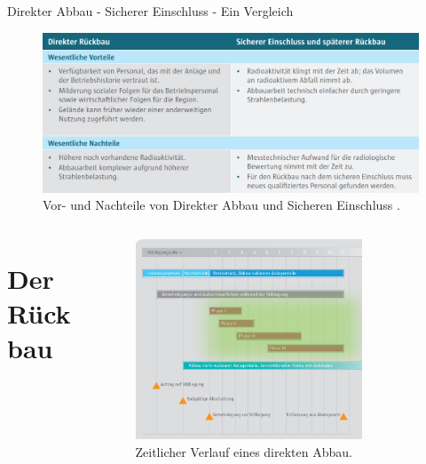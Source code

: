 \begin{frame}{ Direkter Abbau - Sicherer Einschluss - Ein Vergleich}
  \begin{figure}
     \centering
     \includegraphics[width=1\textwidth]{./bilder/vor_nachteile_direkter_einschluss.PNG}
     \caption{ Vor- und Nachteile von Direkter Abbau und Sicheren Einschluss \cite{stilllegung_grs}. }
     \label{ fig: karte_abschaltungen }
   \end{figure}
\end{frame}



\begin{frame}
  \begin{columns}

      \begin{column}{0.2\textwidth}
        \section{Der Rückbau}
      \end{column}

      \begin{column}{0.78\textwidth}
        \begin{figure}
          \centering
          \includegraphics[width=0.8\textwidth]{./bilder/stillegung_phasen.png}
          \caption{ Zeitlicher Verlauf eines direkten Abbau\cite{stilllegung_grs}. }
          \label{ fig: stillegung }
        \end{figure}
      \end{column}

  \end{columns}
\end{frame}



